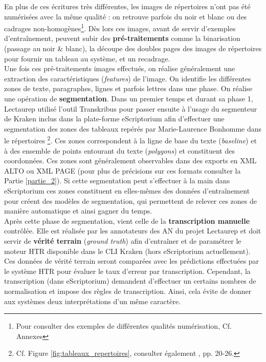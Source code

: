 \clearpage
En plus de ces écritures très différentes, les images de répertoires n'ont pas été numérisées avec la même qualité : on retrouve parfois du noir et blanc ou des cadrages non-homogènes\footnote{Pour consulter des exemples de différentes qualités numérisation, Cf. Annexes }. Dès lors ces images, avant de servir d'exemples d'entraînement, peuvent subir des \textbf{pré-traitements} comme la binarisation (passage au noir \& blanc), la découpe des doubles pages des images de répertoires pour fournir un tableau au système, et un recadrage.\\

Une fois ces pré-traitements images effectués, on réalise généralement une extraction des caractéristiques (\textit{features}) de l'image. On identifie les différentes zones de texte, paragraphes, lignes et parfois lettres dans une phase. On réalise une opération de \textbf{segmentation}. Dans un premier temps et durant sa phase 1, Lectaurep utilisé l'outil Transkribus pour passer ensuite à l'usage du segmenteur de Kraken inclus dans la plate-forme eScriptorium afin d'effectuer une segmentation des zones des tableaux repérés par Marie-Laurence Bonhomme dans le répertoires \footnote{Cf. Figure \ref{fig:tableaux_repertoires}, consulter également \cite{bonhomme_defis_2018}, pp. 20-26.}. Ces zones correspondent à la ligne de base du texte (\textit{baseline}) et à des ensemble de points entourant du texte (\textit{polygons}) et constituent des coordonnées. Ces zones sont généralement observables dans des exports en XML ALTO ou XML PAGE (pour plus de précisions sur ces formats consulter la Partie \ref{partie_2}). Si cette segmentation peut s'effectuer à la main dans eScriptorium ces zones constituent en elles-mêmes des données d'entraînement pour créent des modèles de segmentation, qui permettent de relever ces zones de manière automatique et ainsi gagner du temps. \\

Après cette phase de segmentation, vient celle de la \textbf{transcription manuelle} contrôlée. Elle est réalisée par les annotateurs des AN du projet Lectaurep et doit servir de \textbf{vérité terrain} (\textit{ground truth}) afin d'entraîner et de paramétrer le moteur HTR disponible dans le CLI Kraken (hors eScriptorium actuellement). Ces données de vérité terrain seront comparées avec les prédictions effectuées par le système HTR pour évaluer le taux d'erreur par transcription. Cependant, la transcription  (dans eScriptorium) demandent d'effectuer un certains nombres de normalisation et impose des règles de transcription. Ainsi, cela évite de donner aux systèmes deux interprétations d'un même caractère. 

